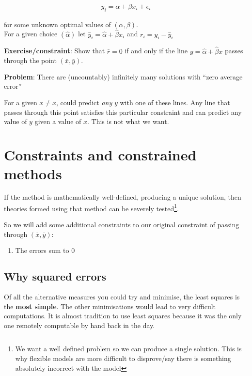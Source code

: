 \documentclass[
]{report}
\providecommand{\tightlist}{%
  \setlength{\itemsep}{0pt}\setlength{\parskip}{0pt}}
\theoremstyle{definition}
\theoremstyle{definition}
\theoremstyle{definition}
\theoremstyle{definition}
\theoremstyle{remark}
\begin{document}
\begin{align*}
y_{i} = \alpha + \beta x_{i} + \epsilon_{i}
\end{align*}

for some unknown optimal values of \((\alpha,\beta)\).\\
For a given choice \((\hat{\alpha})\) let \(\hat{y}_{i} = \hat{\alpha} + \hat{\beta}x_{i}\) and \(r_{i} = y_{i} - \hat{y}_{i}\)

\textbf{Exercise/constraint}: Show that \(\bar r = 0\) if and only if the line \(y = \hat \alpha + \hat \beta x\) passes through the point \((\bar x, \bar y)\).

\textbf{Problem}: There are (uncountably) infinitely many solutions with ``zero
average error''

For a given \(x \neq \bar x\), could predict \emph{any} \(y\) with one of these lines.
Any line that passes through this point satisfies this particular constraint
and can predict any value of \(y\) given a value of \(x\). This is not what we
want.

\hypertarget{constraints-and-constrained-methods}{%
\section{Constraints and constrained methods}\label{constraints-and-constrained-methods}}

If the method is mathematically well-defined, producing a unique solution, then
theories formed using that method can be severely tested\footnote{We want a well
  defined problem so we can produce a single solution. This is why flexible
  models are more difficult to disprove/say there is something absolutely
  incorrect with the model}.

So we will add some additional constraints to our original constraint of
passing through \((\overline{x},\overline{y})\):

\begin{enumerate}
\def\labelenumi{\arabic{enumi}.}
\tightlist
\item
  The errors sum to 0
\end{enumerate}

\hypertarget{why-squared-errors}{%
\subsection{Why squared errors}\label{why-squared-errors}}

Of all the alternative measures you could try and minimise, the least squares
is the \textbf{most simple}. The other minimisations would lead to very difficult
computations. It is almost tradition to use least squares because it was the
only one remotely computable by hand back in the day.
\end{document}
